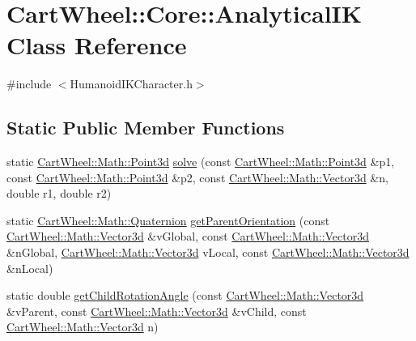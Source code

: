 \hypertarget{classCartWheel_1_1Core_1_1AnalyticalIK}{
\section{CartWheel::Core::AnalyticalIK Class Reference}
\label{classCartWheel_1_1Core_1_1AnalyticalIK}
}


{\ttfamily \#include $<$HumanoidIKCharacter.h$>$}

\subsection*{Static Public Member Functions}
\begin{DoxyCompactItemize}
\item 
static \hyperlink{classCartWheel_1_1Math_1_1Point3d}{CartWheel::Math::Point3d} \hyperlink{classCartWheel_1_1Core_1_1AnalyticalIK_af59040c4461da6eb5d22b37ad6d6cc9b}{solve} (const \hyperlink{classCartWheel_1_1Math_1_1Point3d}{CartWheel::Math::Point3d} \&p1, const \hyperlink{classCartWheel_1_1Math_1_1Point3d}{CartWheel::Math::Point3d} \&p2, const \hyperlink{classCartWheel_1_1Math_1_1Vector3d}{CartWheel::Math::Vector3d} \&n, double r1, double r2)
\item 
static \hyperlink{classCartWheel_1_1Math_1_1Quaternion}{CartWheel::Math::Quaternion} \hyperlink{classCartWheel_1_1Core_1_1AnalyticalIK_aa99c96d71da77221f652ec281457f586}{getParentOrientation} (const \hyperlink{classCartWheel_1_1Math_1_1Vector3d}{CartWheel::Math::Vector3d} \&vGlobal, const \hyperlink{classCartWheel_1_1Math_1_1Vector3d}{CartWheel::Math::Vector3d} \&nGlobal, \hyperlink{classCartWheel_1_1Math_1_1Vector3d}{CartWheel::Math::Vector3d} vLocal, const \hyperlink{classCartWheel_1_1Math_1_1Vector3d}{CartWheel::Math::Vector3d} \&nLocal)
\item 
static double \hyperlink{classCartWheel_1_1Core_1_1AnalyticalIK_a008549347d167dc40c5a1c788522201c}{getChildRotationAngle} (const \hyperlink{classCartWheel_1_1Math_1_1Vector3d}{CartWheel::Math::Vector3d} \&vParent, const \hyperlink{classCartWheel_1_1Math_1_1Vector3d}{CartWheel::Math::Vector3d} \&vChild, const \hyperlink{classCartWheel_1_1Math_1_1Vector3d}{CartWheel::Math::Vector3d} n)
\end{DoxyCompactItemize}


